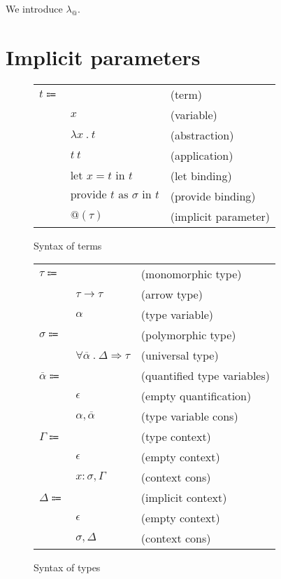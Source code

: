\documentclass[acmlarge]{acmart}
\makeatletter
\newcommand\lambdaarobase{\lambda_@}
\newcommand\labs[2]{\lambda #1 \ . \ #2}
\newcommand\app[2]{#1 \ #2}
\newcommand\llet[3]{\text{let } #1 = #2 \text{ in } #3}
\newcommand\provide[3]{\text{provide } #1 \text{ as } #2 \text{ in } #3}
\newcommand\implicit[1]{ @ \! \left( #1 \right) }
\newcommand\larrow[2]{#1 \rightarrow #2}
\newcommand\tabs[3]{\forall #1 \ . \ #2 \Rightarrow #3}
\makeatother
\begin{document}
  We introduce $\lambdaarobase$.

\section{Implicit parameters}

  \begin{figure}[h!]
    \begin{mdframed}

      \begin{tabular}{l l l}
        $t \Coloneqq $ & & (term) \\
        & $x$ & (variable) \\
        & $\labs{x}{t}$ & (abstraction) \\
        & $\app{t}{t}$ & (application) \\
        & $\llet{x}{t}{t}$ & (let binding) \\
        & $\provide{t}{\sigma}{t}$ & (provide binding) \\
        & $\implicit{\tau}$ & (implicit parameter)
      \end{tabular}

    \end{mdframed}
    \caption{Syntax of terms}
    \label{fig:terms_syntax}
  \end{figure}

  \begin{figure}[h!]
    \begin{mdframed}

      \begin{tabular}{l l l}
        $\tau \Coloneqq$ & & (monomorphic type) \\
        & $\larrow{\tau}{\tau}$ & (arrow type) \\
        & $\alpha$ & (type variable) \\
        $\sigma \Coloneqq$ & & (polymorphic type) \\
        & $\tabs{\overline{\alpha}}{\Delta}{\tau}$ & (universal type) \\
        $\overline{\alpha} \Coloneqq$ & & (quantified type variables) \\
        & $\epsilon$ & (empty quantification) \\
        & $\alpha, \overline{\alpha}$ & (type variable cons) \\
        $\Gamma \Coloneqq$ & & (type context) \\
        & $\epsilon$ & (empty context) \\
        & $x : \sigma, \Gamma$ & (context cons) \\
        $\Delta \Coloneqq$ & & (implicit context) \\
        & $\epsilon$ & (empty context) \\
        & $\sigma, \Delta$ & (context cons)
      \end{tabular}

    \end{mdframed}
    \caption{Syntax of types}
    \label{fig:types_syntax}
  \end{figure}
\end{document}
